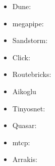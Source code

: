 \begin{itemize}
\item Dune: \cite{dune}
\item megapipe: \cite{megapipe}
\item Sandstorm: \cite{sandstorm}
\item Click: \cite{click}
\item Routebricks: \cite{routebricks}
\item Aikoglu \cite{Atikoglu:2012:WAL}
\item Tinyosnet: \cite{tinyosnet}
\item Quasar: \cite{quasar}
\item mtcp: \cite{mtcp}
\item Arrakis: \cite{arrakis-osdi}
\end{itemize}

